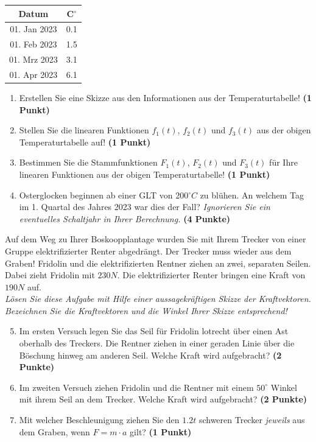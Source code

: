 \documentclass[a4paper, 9pt]{scrartcl}\usepackage[]{graphicx}\usepackage[]{xcolor}
\begin{document}
\begin{center}
\begin{tabular}{cc}
  \toprule
  Datum & C$^\circ$ \\
  \midrule
  01. Jan 2023 & 0.1\\
  01. Feb 2023 & 1.5\\
  01. Mrz 2023 & 3.1\\
  01. Apr 2023 & 6.1\\
  \bottomrule
\end{tabular}
\end{center}

\begin{enumerate}
\item Erstellen Sie eine Skizze aus den Informationen aus der
  Temperaturtabelle!  \textbf{(1 Punkt)}
\item Stellen Sie die linearen Funktionen $f_1(t)$, $f_2(t)$ und
  $f_3(t)$ aus der obigen Temperaturtabelle auf!  \textbf{(1 Punkt)}
\item Bestimmen Sie die Stammfunktionen $F_1(t)$, $F_2(t)$ und $F_3(t)$ f{\"u}r
  Ihre linearen Funktionen aus der obigen Temperaturtabelle!  \textbf{(1
    Punkt)}
\item Osterglocken beginnen ab einer GLT von 200$^\circ C$ zu bl{\"u}hen. An
  welchem Tag im 1. Quartal des Jahres 2023 war dies der
  Fall? \textit{Ignorieren Sie ein eventuelles Schaltjahr in Ihrer Berechnung.} \textbf{(4 Punkte)}
\end{enumerate}

Auf dem Weg zu Ihrer Boskoopplantage wurden Sie mit Ihrem Trecker von
einer Gruppe elektrifizierter Renter abgedr{\"a}ngt. Der Trecker muss wieder
aus dem Graben! Fridolin und die elektrifizierten Rentner ziehen an zwei,
separaten Seilen. Dabei zieht Fridolin mit $230N$. Die
elektrifizierter Renter  bringen eine Kraft von $190N$ auf.\\

\textit{L{\"o}sen Sie diese Aufgabe mit Hilfe einer aussagekr{\"a}ftigen Skizze der
  Kraftvektoren. Bezeichnen Sie die Kraftvektoren und die Winkel Ihrer
  Skizze entsprechend!}

\begin{enumerate}
  \setcounter{enumi}{4}  
\item Im ersten Versuch legen Sie das Seil f{\"u}r Fridolin lotrecht {\"u}ber einen
  Ast oberhalb des Treckers. Die Rentner ziehen in einer geraden Linie {\"u}ber
  die B{\"o}schung hinweg am anderen Seil. Welche Kraft wird aufgebracht?
  \textbf{(2 Punkte)}
\item Im zweiten Versuch ziehen Fridolin und die Rentner mit einem
  $50^\circ$ Winkel mit ihrem Seil an dem Trecker. Welche Kraft
  wird aufgebracht? \textbf{(2 Punkte)}
\item Mit welcher Beschleunigung ziehen Sie den $1.2t$ schweren
  Trecker \textit{jeweils} aus dem Graben, wenn $F = m \cdot a$ gilt?
  \textbf{(1 Punkt)}
\end{enumerate}
\end{document}
